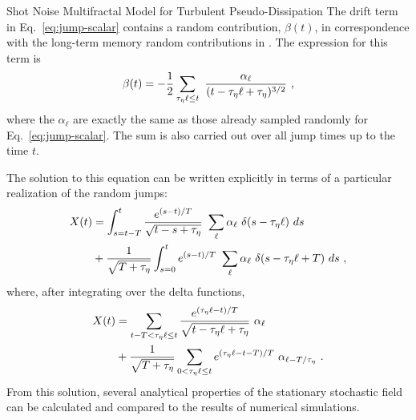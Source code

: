 \begin{chapter}{Shot Noise Multifractal Model for Turbulent Pseudo-Dissipation}
The drift term in Eq.~\eqref{eq:jump-scalar} contains a random contribution, $\beta(t)$, in correspondence with the long-term memory random contributions in \textcite{pereira2018multifractal}. The expression for this term is
\begin{equation} \label{eq:beta}
    \beta(t) = -\frac12 \sum_{\teta \ell \leq t}  \ \frac{\alpha_{\ell}}{(t-\teta \ell + \teta)^{3/2}} \ \mbox{,}
\end{equation}
where the $\alpha_{\ell}$ are exactly the same as those already sampled randomly for Eq.~\eqref{eq:jump-scalar}.
The sum is also carried out over all jump times up to the time $t$.

The solution to this equation can be written explicitly in terms of a particular realization of the random jumps:
\begin{equation}
    \begin{split}
        X(t) &= \int_{s = t-T}^{t} \frac{e^{(s-t)/T}}{\sqrt{t-s+\teta}} \ \sum_{\ell} \alpha_{\ell} \ \delta(s-\teta \ell) \ ds \\
        &+ \frac{1}{\sqrt{T+\teta}} \int_{s=0}^t e^{(s-t)/T} \ \sum_{\ell} \alpha_{\ell} \ \delta(s-\teta \ell+T) \ ds \ ,
    \end{split}
\end{equation}
where, after integrating over the delta functions,
\begin{equation} \label{eq:x-solution}
\begin{split}
        X(t) &= \sum_{t-T < \tau_{\eta} \ell \leq t}
        \frac{e^{(\tau_{\eta} \ell-t)/T}}{\sqrt{t-\tau_{\eta} \ell+\tau_{\eta}}} \  \alpha_{\ell} \\
        &+ \frac{1}{\sqrt{T+\tau_{\eta}}} \sum_{0 < \tau_{\eta} \ell \leq t}
        e^{(\tau_{\eta} \ell-t-T)/T} \ \alpha_{\ell - T/\tau_{\eta}} \ .
\end{split}
\end{equation}
From this solution, several analytical properties of the stationary stochastic field can be calculated and compared to the results of numerical simulations.


\end{chapter}
